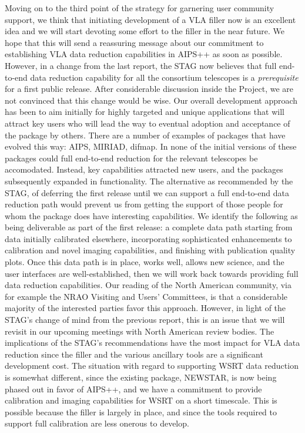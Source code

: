 Moving on to the third point of the strategy for garnering user
community support, we think that initiating development of a VLA
filler now is an excellent idea and we will start devoting some effort
to the filler in the near future. We hope that this will send a
reassuring message about our commitment to establishing VLA data
reduction capabilities in AIPS++ as soon as possible.  However, in a
change from the last report, the STAG now believes that full
end-to-end data reduction capability for all the consortium telescopes
is a {\em prerequisite} for a first public release. After considerable
discussion inside the Project, we are not convinced that this change
would be wise. Our overall development approach has been to aim
initially for highly targeted and unique applications that will
attract key users who will lead the way to eventual adoption and
acceptance of the package by others. There are a number of examples of
packages that have evolved this way: AIPS, MIRIAD, difmap. In none of
the initial versions of these packages could full end-to-end reduction
for the relevant telescopes be accomodated. Instead, key capabilities
attracted new users, and the packages subsequently expanded in
functionality. The alternative as recommended by the STAG, of
deferring the first release until we can support a full end-to-end
data reduction path would prevent us from getting the support of those
people for whom the package does have interesting capabilities. We
identify the following as being deliverable as part of the first
release: a complete data path starting from data initially calibrated
elsewhere, incorporating sophisticated enhancements to calibration and
novel imaging capabilities, and finishing with publication quality
plots.  Once this data path is in place, works well, allows new
science, and the user interfaces are well-established, then we will
work back towards providing full data reduction capabilities. Our
reading of the North American community, via for example the NRAO
Visiting and Users' Committees, is that a considerable majority of the
interested parties favor this approach. However, in light of the
STAG's change of mind from the previous report, this is an issue that
we will revisit in our upcoming meetings with North American review
bodies.  The implications of the STAG's recommendations have the most
impact for VLA data reduction since the filler and the various
ancillary tools are a significant development cost. The situation with
regard to supporting WSRT data reduction is somewhat different, since
the existing package, NEWSTAR, is now being phased out in favor of
AIPS++, and we have a commitment to provide calibration and imaging
capabilities for WSRT on a short timescale. This is possible because
the filler is largely in place, and since the tools required to
support full calibration are less onerous to develop.

